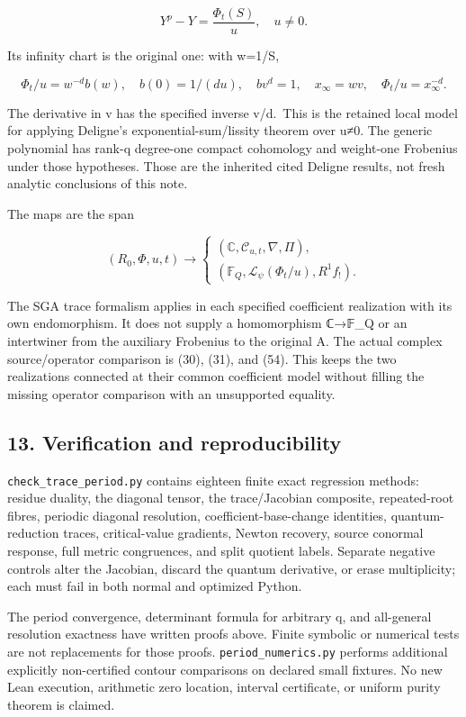 \[
Y^p-Y=\frac{\Phi_t(S)}u,\quad u\ne0.
\tag{60}
\]

Its infinity chart is the original one: with w=1/S,

\[
\Phi_t/u=w^{-d}b(w),\quad b(0)=1/(du),\quad
b v^d=1,\quad x_\infty=wv,\quad \Phi_t/u=x_\infty^{-d}.
\tag{61}
\]

The derivative in v has the specified inverse v/d.~This is the retained local model for applying Deligne's exponential-sum/lissity theorem over u≠0. The generic polynomial has rank-q degree-one compact cohomology and weight-one Frobenius under those hypotheses. Those are the inherited cited Deligne results, not fresh analytic conclusions of this note.

The maps are the span

\[
(R_0,\Phi,u,t)\longrightarrow
\begin{cases}
(\mathbb C,\mathcal C_{u,t},\nabla,\Pi),\\
(\mathbb F_Q,\mathcal L_\psi(\Phi_t/u),R^1f_!).
\end{cases}
\tag{62}
\]

The SGA trace formalism applies in each specified coefficient realization with its own endomorphism. It does not supply a homomorphism ℂ→𝔽\_Q or an intertwiner from the auxiliary Frobenius to the original A. The actual complex source/operator comparison is (30), (31), and (54). This keeps the two realizations connected at their common coefficient model without filling the missing operator comparison with an unsupported equality.

\subsection{13. Verification and reproducibility}\label{endpoint-sga_trace_period--verification-and-reproducibility}

\nolinkurl{check_trace_period.py} contains eighteen finite exact regression methods: residue duality, the diagonal tensor, the trace/Jacobian composite, repeated-root fibres, periodic diagonal resolution, coefficient-base-change identities, quantum-reduction traces, critical-value gradients, Newton recovery, source conormal response, full metric congruences, and split quotient labels. Separate negative controls alter the Jacobian, discard the quantum derivative, or erase multiplicity; each must fail in both normal and optimized Python.

The period convergence, determinant formula for arbitrary q, and all-general resolution exactness have written proofs above. Finite symbolic or numerical tests are not replacements for those proofs. \nolinkurl{period_numerics.py} performs additional explicitly non-certified contour comparisons on declared small fixtures. No new Lean execution, arithmetic zero location, interval certificate, or uniform purity theorem is claimed.

